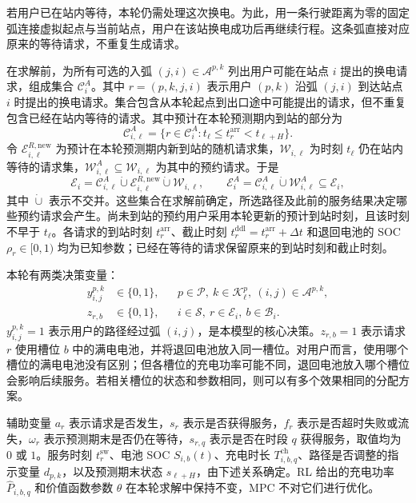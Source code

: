 \documentclass[12pt,a4paper,UTF8]{ctexart}
\begin{document}
若用户已在站内等待，本轮仍需处理这次换电。为此，用一条行驶距离为零的固定弧连接虚拟起点与当前站点，用户在该站换电成功后再继续行程。这条弧直接对应原来的等待请求，不重复生成请求。

在求解前，为所有可选的入弧 $(j,i)\in\mathcal A^{p,k}$ 列出用户可能在站点 $i$ 提出的换电请求，组成集合 $\mathcal C_i^A$。其中 $r=(p,k,j,i)$ 表示用户 $(p,k)$ 沿弧 $(j,i)$ 到达站点 $i$ 时提出的换电请求。集合包含从本轮起点到出口途中可能提出的请求，但不重复包含已经在站内等待的请求。其中预计在本轮预测期内到站的部分为
\[
\mathcal C_{i,\ell}^A
=\{r\in\mathcal C_i^A:t_\ell\le t_r^{\mathrm{arr}}<t_{\ell+H}\}.
\]
令 $\mathcal E_{i,\ell}^{R,\mathrm{new}}$ 为预计在本轮预测期内新到站的随机请求集，$\mathcal W_{i,\ell}$ 为时刻 $t_\ell$ 仍在站内等待的请求集，$\mathcal W_{i,\ell}^A\subseteq\mathcal W_{i,\ell}$ 为其中的预约请求。于是
\begin{equation}
\mathcal E_i=\mathcal C_{i,\ell}^A\mathbin{\dot\cup}\mathcal E_{i,\ell}^{R,\mathrm{new}}\mathbin{\dot\cup}\mathcal W_{i,\ell},
\qquad
\mathcal E_i^A=\mathcal C_{i,\ell}^A\mathbin{\dot\cup}\mathcal W_{i,\ell}^A
\subseteq\mathcal E_i,
\label{eq:request_sets}
\end{equation}
其中 $\dot\cup$ 表示不交并。这些集合在求解前确定，所选路径及此前的服务结果决定哪些预约请求会产生。尚未到站的预约用户采用本轮更新的预计到站时刻，且该时刻不早于 $t_\ell$。各请求的到站时刻 $t_r^{\mathrm{arr}}$、截止时刻 $t_r^{\mathrm{ddl}}=t_r^{\mathrm{arr}}+\Delta t$ 和退回电池的 SOC $\rho_r\in[0,1)$ 均为已知参数；已经在等待的请求保留原来的到站时刻和截止时刻。

本轮有两类决策变量：
\begin{equation}
\begin{aligned}
y_{i,j}^{p,k}&\in\{0,1\},
&&p\in\mathcal P,\ k\in\mathcal K_\ell^p,\ (i,j)\in\mathcal A^{p,k},\\
z_{r,b}&\in\{0,1\},
&&i\in\mathcal S,\ r\in\mathcal E_i,\ b\in\mathcal B_i.
\end{aligned}
\label{eq:decision_variables}
\end{equation}
$y_{i,j}^{p,k}=1$ 表示用户的路径经过弧 $(i,j)$，是本模型的核心决策。$z_{r,b}=1$ 表示请求 $r$ 使用槽位 $b$ 中的满电电池，并将退回电池放入同一槽位。对用户而言，使用哪个槽位的满电电池没有区别；但各槽位的充电功率可能不同，退回电池放入哪个槽位会影响后续服务。若相关槽位的状态和参数相同，则可以有多个效果相同的分配方案。

辅助变量 $a_r$ 表示请求是否发生，$s_r$ 表示是否获得服务，$f_r$ 表示是否超时失败或流失，$\omega_r$ 表示预测期末是否仍在等待，$s_{r,q}$ 表示是否在时段 $q$ 获得服务，取值均为 $0$ 或 $1$。服务时刻 $t_r^{\mathrm{sw}}$、电池 SOC $S_{i,b}(t)$、充电时长 $T_{i,b,q}^{\mathrm{ch}}$、路径是否调整的指示变量 $d_{p,k}$，以及预测期末状态 $s_{\ell+H}$，由下述关系确定。RL 给出的充电功率 $\widehat P_{i,b,q}$ 和价值函数参数 $\theta$ 在本轮求解中保持不变，MPC 不对它们进行优化。
\end{document}
